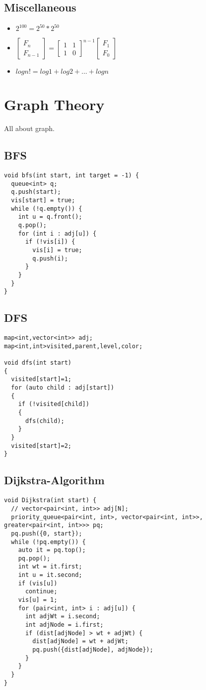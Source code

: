 \documentclass[10pt, a4paper]{article}
\begin{document}
\begin{multicols}{2}
		\subsection{Miscellaneous}
\begin{itemize}
	\item \(2^{100} = 2^{50} * 2^{50}\)
	\item \( 
	\begin{bmatrix}
		F_n\\
		F_{n-1}
	\end{bmatrix} = 
	\begin{bmatrix}
		1 & 1\\
		1 & 0
	\end{bmatrix} ^ {n-1}
	\begin{bmatrix}
		F_1\\
		F_0
	\end{bmatrix}
	\)
	\item \(
	logn! = log1 +log2+...+logn
	\)
\end{itemize}


\section{Graph Theory}
All about graph.
\subsection{BFS}
\begin{lstlisting} 
void bfs(int start, int target = -1) {
  queue<int> q;
  q.push(start);
  vis[start] = true;
  while (!q.empty()) {
    int u = q.front();
    q.pop();
    for (int i : adj[u]) {
      if (!vis[i]) {
        vis[i] = true;
        q.push(i);
      }
    }
  }
}
\end{lstlisting}
\subsection{DFS}
\begin{lstlisting}
map<int,vector<int>> adj;
map<int,int>visited,parent,level,color;

void dfs(int start)
{
  visited[start]=1;
  for (auto child : adj[start])
  {
    if (!visited[child])
    {
      dfs(child);
    }
  }
  visited[start]=2;
}
\end{lstlisting}
\subsection{Dijkstra-Algorithm}
\begin{lstlisting}
void Dijkstra(int start) {
  // vector<pair<int, int>> adj[N];
  priority_queue<pair<int, int>, vector<pair<int, int>>, greater<pair<int, int>>> pq;
  pq.push({0, start});
  while (!pq.empty()) {
    auto it = pq.top();
    pq.pop();
    int wt = it.first;
    int u = it.second;
    if (vis[u])
      continue;
    vis[u] = 1;
    for (pair<int, int> i : adj[u]) {
      int adjWt = i.second;
      int adjNode = i.first;
      if (dist[adjNode] > wt + adjWt) {
        dist[adjNode] = wt + adjWt;
        pq.push({dist[adjNode], adjNode});
      }
    }
  }
}
\end{lstlisting}

\end{multicols}
\end{document}
